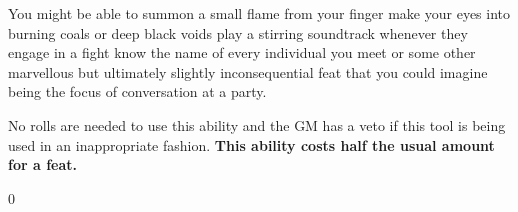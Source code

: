 {{You might be able to summon a small flame from your finger\comma{} make your eyes into burning coals or deep black voids\comma{} play a stirring soundtrack whenever they engage in a fight\comma{} know the name of every individual you meet\comma{} or some other marvellous but ultimately slightly inconsequential feat that you could imagine being the focus of conversation at a party. 

No rolls are needed to use this ability\comma{} and the GM has a veto if this tool is being used in an inappropriate fashion. {\bf This ability costs half the usual amount for a feat.}}{0}{}
	}
